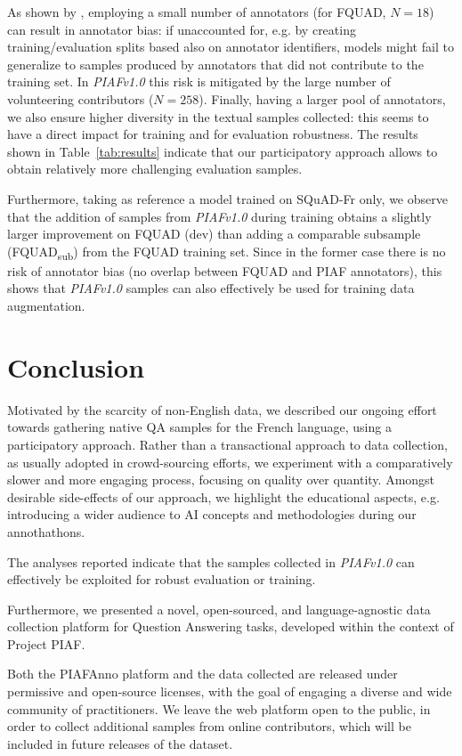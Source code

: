 \documentclass[10pt, a4paper]{article}
\begin{document}
As shown by \cite{geva2019we}, employing a small number of annotators (for FQUAD, $N=18$) can result in annotator bias: if unaccounted for, e.g. by creating training/evaluation splits based also on annotator identifiers, models might fail to generalize to samples produced by annotators that did not contribute to the training set. In \emph{PIAFv1.0} this risk is mitigated by the large number of volunteering contributors ($N=258$). 
Finally, having a larger pool of annotators, we also ensure higher diversity in the textual samples collected: this seems to have a direct impact for training \cite{camembert} and for evaluation robustness.
The results shown in Table~\ref{tab:results} indicate that our participatory approach allows to obtain relatively more challenging evaluation samples. 

Furthermore, taking as reference a model trained on SQuAD-Fr only, we observe that the addition of samples from \emph{PIAFv1.0} during training obtains a slightly larger improvement on FQUAD (dev) than adding a comparable subsample (FQUAD\textsubscript{sub}) from the FQUAD training set. Since in the former case there is no risk of annotator bias (no overlap between FQUAD and PIAF annotators), this shows that \emph{PIAFv1.0} samples can also effectively be used for training data augmentation. 


\section{Conclusion}
Motivated by the scarcity of non-English data, we described our ongoing effort towards gathering native QA samples for the French language, using a participatory approach. Rather than a transactional approach to data collection, as usually adopted in crowd-sourcing efforts, we experiment with a comparatively slower and more engaging process, focusing on quality over quantity.
Amongst desirable side-effects of our approach, we highlight the educational aspects, e.g. introducing a wider audience to AI concepts and methodologies during our annothathons. 

The analyses reported indicate that the samples collected in \emph{PIAFv1.0} can effectively be exploited for robust evaluation or training. 

Furthermore, we presented a novel, open-sourced, and language-agnostic data collection platform for Question Answering tasks, developed within the context of Project PIAF. 

Both the PIAFAnno platform and the data collected are released under permissive and open-source licenses, with the goal of engaging a diverse and wide community of practitioners.
We leave the web platform open to the public, in order to collect additional samples from online contributors, which will be included in future releases of the dataset. 
\end{document}
